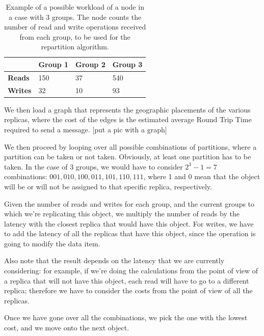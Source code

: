 \begin{table}[htb]
  \centering
  \begin{tabular}{l l l l}
    \hline
    & \textbf{Group 1} & \textbf{Group 2} & \textbf{Group 3} \\
    \hline
    \textbf{Reads} & 150 & 37 & 540 \\
    \textbf{Writes} & 32 & 10 & 93 \\
    \hline
  \end{tabular}
  \caption{Example of a possible workload of a node in a case with 3 groups. The node counts the number of read and write operations received from each group, to be used for the repartition algorithm.}\label{tab:workload-example}
\end{table}

We then load a graph that represents the geographic placements of the various replicas, where the cost of the edges is the estimated average Round Trip Time required to send a message.
[put a pic with a graph]

We then proceed by looping over all possible combinations of partitions, where a partition can be taken or not taken. Obviously, at least one partition has to be taken. In the case of 3 groups, we would have to consider $2^3 -1 = 7$ combinations: $001, 010, 100, 011, 101, 110, 111$, where 1 and 0 mean that the object will be or will not be assigned to that specific replica, respectively.

Given the number of reads and writes for each group, and the current groups to which we're replicating this object, we multiply the number of reads by the latency with the closest replica that would have this object. For writes, we have to add the latency of all the replicas that have this object, since the operation is going to modify the data item.

Also note that the result depends on the latency that we are currently considering: for example, if we're doing the calculations from the point of view of a replica that will not have this object, each read will have to go to a different replica; therefore we have to consider the costs from the point of view of all the replicas.

Once we have gone over all the combinations, we pick the one with the lowest cost, and we move onto the next object.

